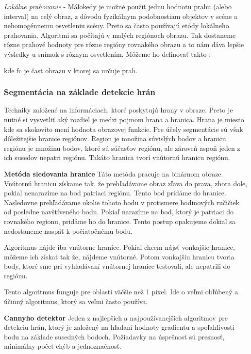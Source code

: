 \textit{Lokálne prahovanie} - Málokedy je možné použiť jednu hodnotu prahu (alebo interval) na celý obraz, z dôvodu fyzikálnym podobnostiam objektov v scéne a  nehomogénnemu osvetleniu scény. Preto sa často používajú etódy lokálneho prahovania. Algoritmi sa počítajú v malých regiónoch obrazu. Tak dostaneme rôzne prahové hodnoty pre rôzne regióny rovnakého obrazu a to nám dáva lepšie výsledky u snímok s rôznym osvetlením. Môžeme ho definovať takto : 


kde fc je časť obrazu v ktorej sa určuje prah. 

\subsubsection{Segmentácia na základe detekcie hrán}
Techniky založené na informáciach, ktoré poskytujú hrany v obraze. Preto je  nutné si vysvetliť aký rozdiel je medzi pojmom hrana a hranica. Hrana je miesto kde sa skokovito mení hodnota obrazovej funkcie. Pre účely segmentácie sú však dôležitejšie hranice regiónov.  Region je množina súvislých bodov a hranicu regiónu je množinu bodov, ktoré sú súčasťov regiónu, ale zároveň aspoň jeden z ich susedov nepatri regiónu. Takáto hranica tvorí vnútornú hranicu regiónu. 

\textbf{Metóda sledovania hranice}
Táto metóda pracuje na binárnom obraze. Vnútornú hranicu získame tak, že  prehľadávame obraz zľava do prava, zhora dole, pokiaľ nenarazíme na bod patriaci regiónu. Tento bod pridáme do hranice. Nasledovne prehľadávame okolie tohoto bodu v protismere hodinových ručičiek od posledne navštíveného bodu. Pokiaľ narazíme na bod, ktorý je patriaci do rovnakého regionu, pridáme ho do hranice. Tento postup opakujeme dokiaľ sa nedostaneme naspäť k počiatočnému bodu. 

Algoritmus nájde iba vnútorne hranice. Pokiaľ chcem nájsť vonkajšie hranice, môžeme ich získať tak že, nájdeme vnútorné. Potom vonkajšiu hranicu tvoria body, ktoré sme pri vyhľadávaní vnútornej hranice testovali, ale nepatrili do regiónu. 

Tento algoritmus funguje pre oblasti väčšie než 1 pixel.  Ide o veľmi obľúbený a účinný algoritmus, ktorý sa veľmi často používa.

\textbf{Cannyho detektor}
Jeden z najlepších a najpoužívanejších algoritmov pre detekciu hrán, ktorý je založený na hľadaní hodnoty gradientu a spoľahlivosti bodu na základe susedných bodoch. Požiadavky na úspešnosť sú presnosť, minimálny počet chýb a jednoznačnosť. 

